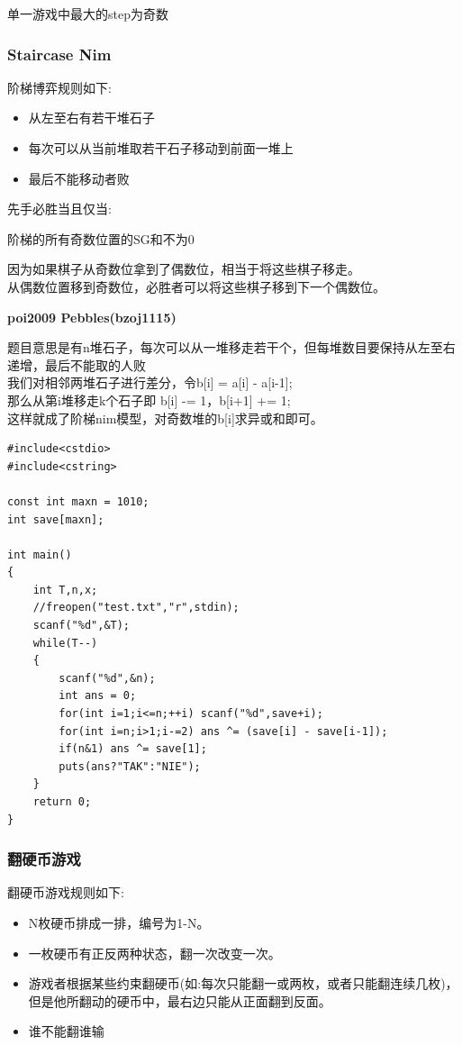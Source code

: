 \documentclass{article}
\begin{document}
单一游戏中最大的step为奇数

\subsubsection{Staircase Nim}

阶梯博弈规则如下:
\begin{itemize}
\item 从左至右有若干堆石子
\item 每次可以从当前堆取若干石子移动到前面一堆上
\item 最后不能移动者败
\end{itemize}

先手必胜当且仅当:

阶梯的所有奇数位置的SG和不为0

因为如果棋子从奇数位拿到了偶数位，相当于将这些棋子移走。\\
从偶数位置移到奇数位，必胜者可以将这些棋子移到下一个偶数位。

\textbf{poi2009 Pebbles(bzoj1115)}

题目意思是有n堆石子，每次可以从一堆移走若干个，但每堆数目要保持从左至右递增，最后不能取的人败 \\
我们对相邻两堆石子进行差分，令b[i] = a[i] - a[i-1];	\\
那么从第i堆移走k个石子即 b[i] -= 1，b[i+1] += 1;	\\
这样就成了阶梯nim模型，对奇数堆的b[i]求异或和即可。	\\

\begin{lstlisting}
#include<cstdio>
#include<cstring>

const int maxn = 1010;
int save[maxn];

int main()
{
    int T,n,x;
    //freopen("test.txt","r",stdin);
    scanf("%d",&T);
    while(T--)
    {
        scanf("%d",&n);
        int ans = 0;
        for(int i=1;i<=n;++i) scanf("%d",save+i); 
        for(int i=n;i>1;i-=2) ans ^= (save[i] - save[i-1]);
        if(n&1) ans ^= save[1];
        puts(ans?"TAK":"NIE");
    }
    return 0;
}
\end{lstlisting}

\subsubsection{翻硬币游戏}

翻硬币游戏规则如下:
\begin{itemize}
\item N枚硬币排成一排，编号为1-N。
\item 一枚硬币有正反两种状态，翻一次改变一次。
\item 游戏者根据某些约束翻硬币(如:每次只能翻一或两枚，或者只能翻连续几枚)，但是他所翻动的硬币中，最右边只能从正面翻到反面。
\item 谁不能翻谁输
\end{itemize}
\end{document}
